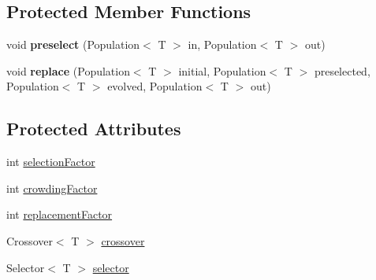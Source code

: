 \subsection*{Protected Member Functions}
\begin{DoxyCompactItemize}
\item 
\hypertarget{classjenes_1_1stage_1_1operator_1_1common_1_1_multi_niche_crowder_3_01_t_01extends_01_chromosome_01_4_ae3e96b6cd96f375209e9308bb7f9ca85}{void {\bfseries preselect} (Population$<$ T $>$ in, Population$<$ T $>$ out)}\label{classjenes_1_1stage_1_1operator_1_1common_1_1_multi_niche_crowder_3_01_t_01extends_01_chromosome_01_4_ae3e96b6cd96f375209e9308bb7f9ca85}

\item 
\hypertarget{classjenes_1_1stage_1_1operator_1_1common_1_1_multi_niche_crowder_3_01_t_01extends_01_chromosome_01_4_a619884821dabf179aed435269366114e}{void {\bfseries replace} (Population$<$ T $>$ initial, Population$<$ T $>$ preselected, Population$<$ T $>$ evolved, Population$<$ T $>$ out)}\label{classjenes_1_1stage_1_1operator_1_1common_1_1_multi_niche_crowder_3_01_t_01extends_01_chromosome_01_4_a619884821dabf179aed435269366114e}

\end{DoxyCompactItemize}
\subsection*{Protected Attributes}
\begin{DoxyCompactItemize}
\item 
int \hyperlink{classjenes_1_1stage_1_1operator_1_1common_1_1_multi_niche_crowder_3_01_t_01extends_01_chromosome_01_4_ab561927a8af185e69bd5fcf85e904d7a}{selection\-Factor}
\item 
int \hyperlink{classjenes_1_1stage_1_1operator_1_1common_1_1_multi_niche_crowder_3_01_t_01extends_01_chromosome_01_4_ad7320907a72bd19c028f922383667560}{crowding\-Factor}
\item 
int \hyperlink{classjenes_1_1stage_1_1operator_1_1common_1_1_multi_niche_crowder_3_01_t_01extends_01_chromosome_01_4_a9a068eae86d3af67f89cfa4b244810fb}{replacement\-Factor}
\item 
Crossover$<$ T $>$ \hyperlink{classjenes_1_1stage_1_1operator_1_1common_1_1_multi_niche_crowder_3_01_t_01extends_01_chromosome_01_4_ad584be099b23576ec3379a6867d31ef4}{crossover}
\item 
Selector$<$ T $>$ \hyperlink{classjenes_1_1stage_1_1operator_1_1common_1_1_multi_niche_crowder_3_01_t_01extends_01_chromosome_01_4_aec9f82fc79b7a63f5e664dfbcc7e9563}{selector}
\end{DoxyCompactItemize}


